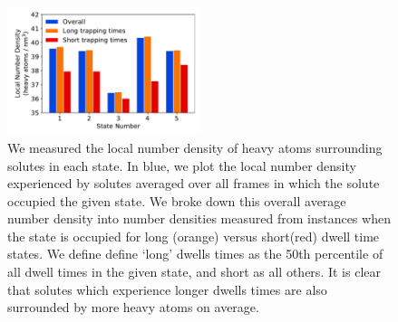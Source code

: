 \documentclass{article}
\begin{document}
  \begin{figure}[h]
  \centering
  \includegraphics[width=0.5\textwidth]{local_densities.pdf}
  \caption{We measured the local number density of heavy atoms surrounding solutes in each
  state. In blue, we plot the local number density experienced by solutes averaged over all
  frames in which the solute occupied the given state. We broke down this overall average 
  number density into number densities measured from instances when the state is occupied 
  for long (orange) versus short(red) dwell time states. We define define `long' dwells times
  as the 50th percentile of all dwell times in the given state, and short as all others. It
  is clear that solutes which experience longer dwells times are also surrounded by more 
  heavy atoms on average.}\label{fig:local_densities}
  \end{figure}
  
\end{document}
